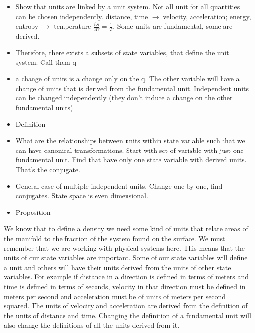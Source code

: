 \documentclass{article}
\begin{document}
\begin{itemize}
	\item Show that units are linked by a unit system. Not all unit for all quantities can be chosen independently. distance, time $\to$ velocity, acceleration; energy, entropy $\to$ temperature $\frac{\partial{S}}{\partial U} = \frac{1}{T}$. Some units are fundamental, some are derived.
	
	\item Therefore, there exists a subsets of state variables, that define the unit system. Call them q
	
	\item a change of units is a change only on the q.  The other variable will have a change of units that is derived from the fundamental unit. Independent units can be changed independently (they don't induce a change on the other fundamental units)
	
	\item Definition
	
	\item What are the relationships between units within state variable such that we can have canonical transformations. Start with set of variable with just one fundamental unit. Find that have only one state variable with derived units. That's the conjugate.
	
	\item General case of multiple independent units. Change one by one, find conjugates. State space is even dimensional.
	
	\item Proposition
	
\end{itemize}


	We know that to define a density we need some kind of units that relate areas of the manifold to the fraction of the system found on the surface. We must remember that we are working with physical systems here. This means that the units of our state variables are important. Some of our state variables will define a unit and others will have their units derived from the units of other state variables. For example if distance in a direction is defined in terms of meters and time is defined in terms of seconds, velocity in that direction must be defined in meters per second and acceleration must be of units of meters per second squared. The units of velocity and acceleration are derived from the definition of the units of distance and time. Changing the definition of a fundamental unit will also change the definitions of all the units derived from it. 
	
\end{document}
